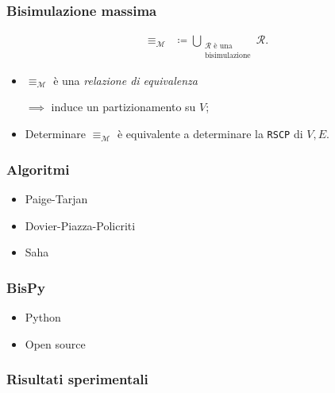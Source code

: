 \documentclass{beamer}
\begin{document}
\begin{frame}
    \frametitle{Bisimulazione massima}


    \begin{gather*}
        \equiv_\mathcal{M} \,\,\,\coloneqq \bigcup_{\substack{\mathcal{R} \text{ è una}\\\text{bisimulazione}}} \mathcal{R}.
    \end{gather*}

    \begin{itemize}
        \item $\equiv_\mathcal{M}$ è una \emph{relazione di equivalenza}

        $\implies$ induce un partizionamento su $V$;
        \item Determinare $\equiv_\mathcal{M}$ è equivalente a determinare la \texttt{RSCP} di $V,E$.
    \end{itemize}
\end{frame}

\begin{frame}
    \frametitle{Algoritmi}
    \begin{itemize}
        \item Paige-Tarjan
        \item Dovier-Piazza-Policriti
        \item Saha
    \end{itemize}
\end{frame}

\begin{frame}
    \frametitle{BisPy}
    \begin{itemize}
        \item Python
        \item Open source
    \end{itemize}
\end{frame}

\begin{frame}
    \frametitle{Risultati sperimentali}
\end{frame}
\end{document}
